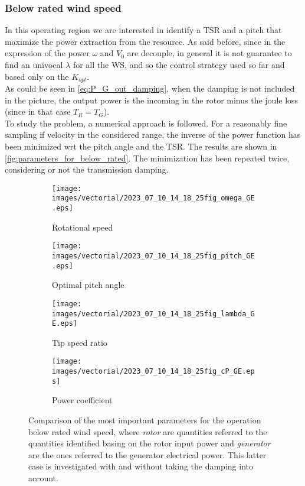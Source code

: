 \subsubsection{Below rated wind speed}
In this operating region we are interested in identify a \acrlong{TSR} and a pitch that maximize the power extraction from the resource. As said before, since in the expression of the power $\omega$ and $V_0$ are decouple, in general it is not guarantee to find an univocal $\lambda$ for all the \acrshort{WS}, and so the control strategy used so far and based only on the $K_{opt}$.\\
As could be seen in \autoref{eq:P_G_out_damping}, when the damping is not included in the picture, the output power is the incoming in the rotor minus the joule loss (since in that case $T_R =T_G$).\\
To study the problem, a numerical approach is followed. 
For a reasonably fine sampling if velocity in the considered range, the inverse of the power function has been minimized wrt the pitch angle and the TSR. The results are shown in \autoref{fig:parameters_for_below_rated}. The minimization has been repeated twice, considering or not the transmission damping.
\begin{figure}[htb]
  \begin{subfigure}{0.5\textwidth}
    \centering
    \texttt{[image: images/vectorial/2023\_07\_10\_14\_18\_25fig\_omega\_GE.eps]}
    \caption{Rotational speed}
    \label{fig:2023_07_10_14_18_25fig_omega_GE}
  \end{subfigure}
  \begin{subfigure}{0.5\textwidth}
    \centering
    \texttt{[image: images/vectorial/2023\_07\_10\_14\_18\_25fig\_pitch\_GE.eps]}
    \caption{Optimal pitch angle}
    \label{fig:2023_06_24_15_57_04fig_pitch_GE}
  \end{subfigure}
  \begin{subfigure}{0.5\textwidth}
    \centering
    \texttt{[image: images/vectorial/2023\_07\_10\_14\_18\_25fig\_lambda\_GE.eps]}
    \caption{Tip speed ratio}
    \label{fig:2023_06_24_15_57_04fig_lambda_GE}
  \end{subfigure}
  \begin{subfigure}{0.5\textwidth}
    \centering
    \texttt{[image: images/vectorial/2023\_07\_10\_14\_18\_25fig\_cP\_GE.eps]}
    \caption{Power coefficient}
    \label{fig:2023_06_24_15_57_04fig_cP_GE}
  \end{subfigure}
  \caption{Comparison of the most important parameters for the operation below rated wind speed, where \textit{rotor} are quantities referred to the quantities identified basing on the rotor input power and \textit{generator} are the ones referred to the generator electrical power. This latter case is investigated with and without taking the damping into account.}
  \label{fig:parameters_for_below_rated}
\end{figure}

